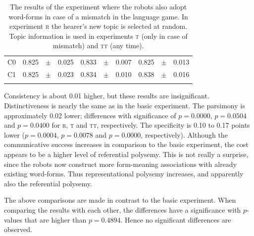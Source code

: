\begin{table}
\begin{tabular}{ld{4}@{~}c@{~}d{4}d{4}@{~}c@{~}d{4}d{4}@{~}c@{~}d{4}}
		C0      &          0.825 & $\pm$ &       0.025&          0.833 & $\pm$ &       0.007&          0.825 & $\pm$ &       0.013\\%
		C1      &          0.825 & $\pm$ &       0.023&          0.834 & $\pm$ &       0.010&          0.838 & $\pm$ &       0.016\\%
		\lspbottomrule
	\end{tabular}
	\caption{The results of the experiment where the robots also adopt word-forms in case of a mismatch in the language game. In experiment {\scshape r} the hearer's new topic is selected at random. Topic information is used in experiments {\scshape t} (only in case of mismatch) and {\scshape tt} (any time).}
	\label{t:lex:ass}
\end{table}

Consistency is about 0.01 higher, but these results are insignificant. Distinctiveness is nearly the same as in the basic experiment. The parsimony is approximately 0.02 lower; differences with significance of $p=0.0000$, $p=0.0504$ and $p=0.0400$ for {\scshape r}, {\scshape t} and {\scshape tt}, respectively. The specificity is 0.10 to 0.17 points lower ($p=0.0004$, $p=0.0078$ and $p=0.0000$, respectively). Although the communicative success increases in comparison to the basic experiment, the cost appears to be a higher level of referential polysemy. This is not really a surprise, since the robots now construct more form-meaning associations with already existing word-forms. Thus representational polysemy increases, and apparently also the referential polysemy.

The above comparisons are made in contrast to the basic experiment. When comparing the results with each other, the differences have a significance with $p$-values that are higher than $p=0.4894$. Hence no significant differences are observed.

